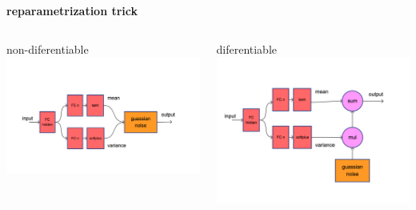 \documentclass[xcolor=dvipsnames]{beamer}
\begin{document}
\begin{frame}{\bf reparametrization trick}

   \begin{columns}

    \begin{column}{0.5\textwidth}
      non-diferentiable \\
      \includegraphics[scale=0.12]{../diagrams/reparametrizationtrick0.png}
    \end{column}

    \begin{column}{0.5\textwidth}
      diferentiable \\
      \includegraphics[scale=0.12]{../diagrams/reparametrizationtrick1.png}
    \end{column}

  \end{columns}

\end{frame}
\end{document}

